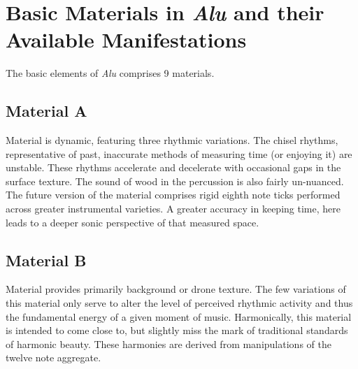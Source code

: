 \section{Basic Materials in \emph{Alu} and their Available Manifestations}

The basic elements of \textit{Alu} comprises 9 materials.

    

    

    

\subsection{Material A}

Material  is dynamic, featuring three rhythmic variations. The chisel rhythms, representative of past, inaccurate methods of measuring time (or enjoying it) are unstable. These rhythms accelerate and decelerate with occasional gaps in the surface texture. The sound of wood in the percussion is also fairly un-nuanced. The future version of the material comprises rigid eighth note ticks performed across greater instrumental varieties. A greater accuracy in keeping time, here leads to a deeper sonic perspective of that measured space.

\subsection{Material B}

Material  provides primarily background or drone texture. The few variations of this material only serve to alter the level of perceived rhythmic activity and thus the fundamental energy of a given moment of music. Harmonically, this material is intended to come close to, but slightly miss the mark of traditional standards of harmonic beauty. These harmonies are derived from manipulations of the twelve note aggregate.

